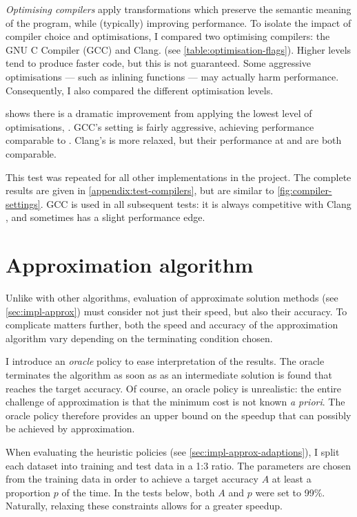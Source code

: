 \emph{Optimising compilers} apply transformations which preserve the semantic meaning of the program, while (typically) improving performance. To isolate the impact of compiler choice and optimisations, I compared two optimising compilers: the GNU C Compiler (GCC) and Clang. (see \cref{table:optimisation-flags}). Higher levels tend to produce faster code, but this is not guaranteed. Some aggressive optimisations --- such as inlining functions --- may actually harm performance. Consequently, I also compared the different optimisation levels.

 shows there is a dramatic improvement from applying the lowest level of optimisations, . GCC's  setting is fairly aggressive, achieving performance comparable to . Clang's is more relaxed, but their performance at  and  are both comparable.

This test was repeated for all other implementations in the project. The complete results are given in \cref{appendix:test-compilers}, but are similar to \cref{fig:compiler-settings}. GCC  is used in all subsequent tests: it is always competitive with Clang , and sometimes has a slight performance edge.

\section{Approximation algorithm} \label{sec:eval-approx}

Unlike with other algorithms, evaluation of approximate solution methods (see \cref{sec:impl-approx}) must consider not just their speed, but also their accuracy\footnotemark. To complicate matters further, both the speed and accuracy of the approximation algorithm vary depending on the terminating condition chosen.

I introduce an \emph{oracle} policy to ease interpretation of the results. The oracle terminates the algorithm as soon as as an intermediate solution is found that reaches the target accuracy. Of course, an oracle policy is unrealistic: the entire challenge of approximation is that the minimum cost is not known \textit{a priori}. The oracle policy therefore provides an upper bound on the speedup that can possibly be achieved by approximation.

When evaluating the heuristic policies (see \cref{sec:impl-approx-adaptions}), I split each dataset into training and test data in a 1:3 ratio. The parameters are chosen from the training data in order to achieve a target accuracy $A$ at least a proportion $p$ of the time. In the tests below, both $A$ and $p$ were set to 99\%. Naturally, relaxing these constraints allows for a greater speedup.

